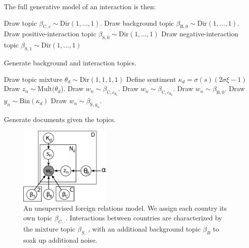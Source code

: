 The full generative model of an interaction is then:
  \begin{algorithm}[tb]
    \begin{algorithmic}
    \STATE Draw topic $\beta_{\mbox{C},c} \sim \mbox{Dir}(1, \ldots, 1)$.
    \ENDFOR
    \STATE Draw background topic $\beta_{\mbox{B},0} \sim \mbox{Dir}(1, \ldots, 1)$.
    \STATE Draw positive-interaction topic $\beta_{\mbox{S},0} \sim \mbox{Dir}(1, \ldots, 1)$
    \STATE Draw negative-interaction topic $\beta_{\mbox{S},1} \sim \mbox{Dir}(1, \ldots, 1)$
\end{algorithmic}
  \caption{Generate background and interaction topics.}
\end{algorithm}
\begin{algorithm*}
\begin{algorithmic}
    \STATE Draw topic mixture $\theta_d \sim \mbox{Dir}(1, 1, 1, 1)$
    \STATE Define sentiment $\kappa_d = \sigma(s) (2 \sigma{\xi} - 1)$
    \STATE Draw $z_{n} \sim \mbox{Mult}(\theta_d$).
    \STATE Draw $w_n \sim \beta_{\mbox{C},c_{d_1}}$.
    \STATE Draw $w_n \sim \beta_{\mbox{C},c_{d_2}}$.
    \STATE Draw $w_n \sim \beta_{\mbox{B},0}$.
    \STATE Draw $y_n \sim \mbox{Bin}(\kappa_d)$
    \STATE Draw $w_n \sim \beta_{\mbox{S},y_n}$.
    \ENDIF
    \ENDFOR
    \ENDFOR
  \end{algorithmic}
  \caption{Generate documents given the topics.}
  \label{figure:second_order_algorithm}
\end{algorithm*}

\begin{figure}
  \includegraphics[width=0.4\textwidth]{chapter_foreign_relations/figures/fr_lda_gm.pdf}
  \caption{An unsupervised foreign relations model.  We assign each
    country its own topic $\beta_{C,\cdot}$.  Interactions between
    countries are characterized by the mixture topic
    $\beta_{S,\cdot}$, with an additional background topic $\beta_B$
    to soak up additional noise.}
\end{figure}


